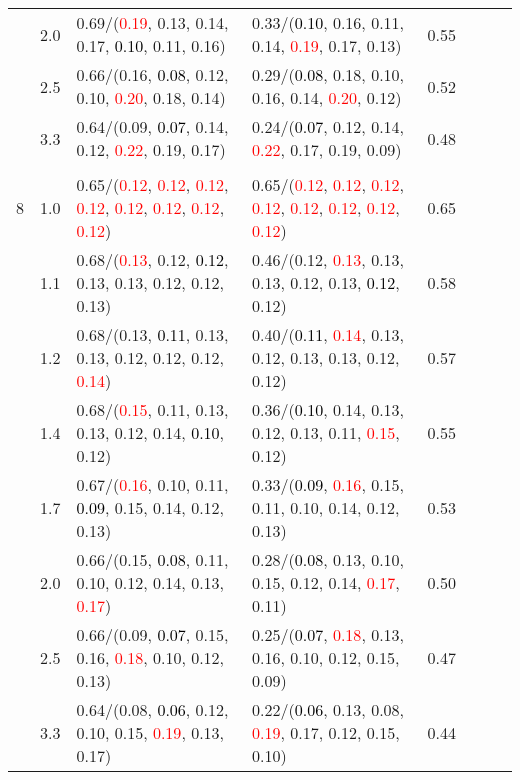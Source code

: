 \documentclass[10pt,a4paper]{report}
\begin{document}
\begin{table}[!htbp]
\begin{center}
{\begin{tabular}{ccllcccc}
			&2.0&0.69/(\textcolor{red}{0.19}, 0.13, 0.14, 0.17, \textcolor{black}{0.10}, 0.11, 0.16)&0.33/(\textcolor{black}{0.10}, 0.16, 0.11, 0.14, \textcolor{red}{0.19}, 0.17, 0.13)&0.55\\
			&2.5&0.66/(0.16, \textcolor{black}{0.08}, 0.12, 0.10, \textcolor{red}{0.20}, 0.18, 0.14)&0.29/(\textcolor{black}{0.08}, 0.18, 0.10, 0.16, 0.14, \textcolor{red}{0.20}, 0.12)&0.52\\
			&3.3&0.64/(0.09, \textcolor{black}{0.07}, 0.14, 0.12, \textcolor{red}{0.22}, 0.19, 0.17)&0.24/(\textcolor{black}{0.07}, 0.12, 0.14, \textcolor{red}{0.22}, 0.17, 0.19, 0.09)&0.48\\
			&&&&\\
			8			&1.0&0.65/(\textcolor{red}{0.12}, \textcolor{red}{0.12}, \textcolor{red}{0.12}, \textcolor{red}{0.12}, \textcolor{red}{0.12}, \textcolor{red}{0.12}, \textcolor{red}{0.12}, \textcolor{red}{0.12})&0.65/(\textcolor{red}{0.12}, \textcolor{red}{0.12}, \textcolor{red}{0.12}, \textcolor{red}{0.12}, \textcolor{red}{0.12}, \textcolor{red}{0.12}, \textcolor{red}{0.12}, \textcolor{red}{0.12})&0.65\\
			&1.1&0.68/(\textcolor{red}{0.13}, 0.12, \textcolor{black}{0.12}, 0.13, 0.13, 0.12, 0.12, 0.13)&0.46/(0.12, \textcolor{red}{0.13}, 0.13, 0.13, 0.12, 0.13, \textcolor{black}{0.12}, 0.12)&0.58\\
			&1.2&0.68/(0.13, \textcolor{black}{0.11}, 0.13, 0.13, 0.12, 0.12, 0.12, \textcolor{red}{0.14})&0.40/(\textcolor{black}{0.11}, \textcolor{red}{0.14}, 0.13, 0.12, 0.13, 0.13, 0.12, 0.12)&0.57\\
			&1.4&0.68/(\textcolor{red}{0.15}, 0.11, 0.13, 0.13, 0.12, 0.14, \textcolor{black}{0.10}, 0.12)&0.36/(\textcolor{black}{0.10}, 0.14, 0.13, 0.12, 0.13, 0.11, \textcolor{red}{0.15}, 0.12)&0.55\\
			&1.7&0.67/(\textcolor{red}{0.16}, 0.10, 0.11, \textcolor{black}{0.09}, 0.15, 0.14, 0.12, 0.13)&0.33/(\textcolor{black}{0.09}, \textcolor{red}{0.16}, 0.15, 0.11, 0.10, 0.14, 0.12, 0.13)&0.53\\
			&2.0&0.66/(0.15, \textcolor{black}{0.08}, 0.11, 0.10, 0.12, 0.14, 0.13, \textcolor{red}{0.17})&0.28/(\textcolor{black}{0.08}, 0.13, 0.10, 0.15, 0.12, 0.14, \textcolor{red}{0.17}, 0.11)&0.50\\
			&2.5&0.66/(0.09, \textcolor{black}{0.07}, 0.15, 0.16, \textcolor{red}{0.18}, 0.10, 0.12, 0.13)&0.25/(\textcolor{black}{0.07}, \textcolor{red}{0.18}, 0.13, 0.16, 0.10, 0.12, 0.15, 0.09)&0.47\\
			&3.3&0.64/(0.08, \textcolor{black}{0.06}, 0.12, 0.10, 0.15, \textcolor{red}{0.19}, 0.13, 0.17)&0.22/(\textcolor{black}{0.06}, 0.13, 0.08, \textcolor{red}{0.19}, 0.17, 0.12, 0.15, 0.10)&0.44\\
			\bottomrule
		\end{tabular}}
	\end{center}
\end{table}
\end{document}

